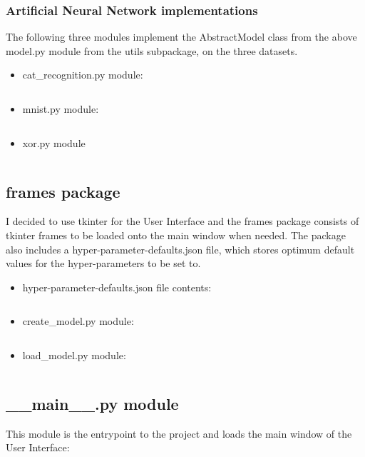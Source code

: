 \documentclass[./project-report/src/latex/project-report.tex]{subfiles}
\begin{document}
\subsubsection{Artificial Neural Network implementations}

The following three modules implement the AbstractModel class from the above model.py module from the utils subpackage, on the three datasets.

\begin{itemize}
    \item cat\_recognition.py module:
        \inputminted{python}{./school_project/models/cpu/cat_recognition.py}
    \item mnist.py module:
        \inputminted{python}{./school_project/models/cpu/mnist.py}
    \item xor.py module
        \inputminted{python}{./school_project/models/cpu/xor.py}
\end{itemize}

\subsection{frames package}

I decided to use tkinter for the User Interface and the frames package consists of tkinter frames to be loaded onto the main window when needed. The package also 
includes a hyper-parameter-defaults.json file, which stores optimum default values for the hyper-parameters to be set to.

\begin{itemize}
    \item hyper-parameter-defaults.json file contents:
        \inputminted{json}{./school_project/frames/hyper-parameter-defaults.json}
    \item create\_model.py module:
        \inputminted{python}{./school_project/frames/create_model.py}
    \item load\_model.py module:
        \inputminted{python}{./school_project/frames/load_model.py}
\end{itemize}

\subsection{\_\_main\_\_.py module}

This module is the entrypoint to the project and loads the main window of the User Interface:
\inputminted{python}{./school_project/__main__.py}
\end{document}
